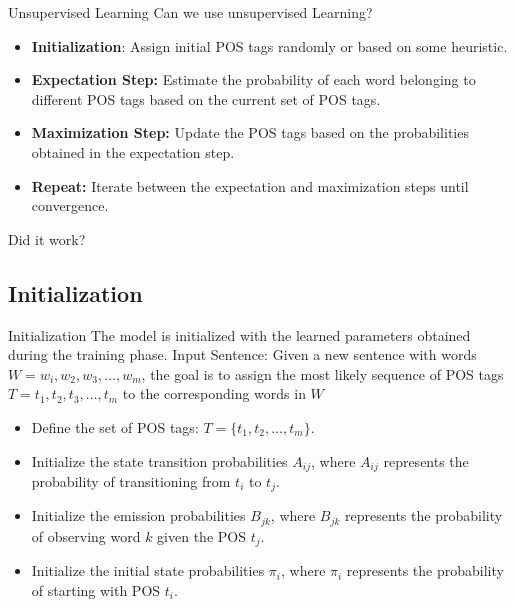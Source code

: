 \begin{frame}{Unsupervised Learning}
    Can we use unsupervised Learning?
    \begin{itemize}
        \item \textbf{Initialization}:
        Assign initial POS tags randomly or based on some heuristic.
        \item \textbf{Expectation Step:}
        Estimate the probability of each word belonging to different POS tags based on the current set of POS tags.
        \item \textbf{Maximization Step:}
        Update the POS tags based on the probabilities obtained in the expectation step.
        \item \textbf{Repeat:}
        Iterate between the expectation and maximization steps until convergence.
    \end{itemize}

    Did it work? 
\end{frame}
\subsection{Initialization}
\begin{frame}{Initialization}
    The model is initialized with the learned parameters obtained during the training phase.
    Input Sentence:
    Given a new sentence with words
    $W = w_i, w_2, w_3, \ldots, w_m$, the goal is to assign the most likely sequence of POS tags $T = t_1, t_2, t_3, \ldots, t_m$ to the corresponding words in $W$

\begin{itemize}
    \item Define the set of POS tags: $T = \{t_1, t_2, \ldots, t_m\}$.
    \item Initialize the state transition probabilities $A_{ij}$, where $A_{ij}$ represents the probability of transitioning from  $t_i$ to $t_j$.
    \item Initialize the emission probabilities $B_{jk}$, where $B_{jk}$ represents the probability of observing word $k$ given the POS  $t_j$.
    \item Initialize the initial state probabilities $\pi_i$, where $\pi_i$ represents the probability of starting with POS  $t_i$.
\end{itemize}
\end{frame}

